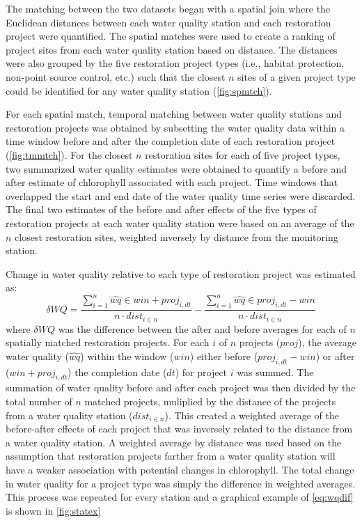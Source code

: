 \documentclass[]{article}
\begin{document}
The matching between the two datasets began with a spatial join where
the Euclidean distances between each water quality station and each
restoration project were quantified. The spatial matches were used to
create a ranking of project sites from each water quality station based
on distance. The distances were also grouped by the five restoration
project types (i.e., habitat protection, non-point source control, etc.)
such that the closest \(n\) sites of a given project type could be
identified for any water quality station (\cref{fig:spmtch}).

For each spatial match, temporal matching between water quality stations
and restoration projects was obtained by subsetting the water quality
data within a time window before and after the completion date of each
restoration project (\cref{fig:tmmtch}). For the closest \(n\)
restoration sites for each of five project types, two summarized water
quality estimates were obtained to quantify a before and after estimate
of chlorophyll associated with each project. Time windows that
overlapped the start and end date of the water quality time series were
discarded. The final two estimates of the before and after effects of
the five types of restoration projects at each water quality station
were based on an average of the \(n\) closest restoration sites,
weighted inversely by distance from the monitoring station.

Change in water quality relative to each type of restoration project was
estimated as: \begin{equation}
\delta WQ = \frac{\sum_{i = 1}^{n} \hat{wq} \in win + proj_{i, dt}}{n \cdot dist_{i \in n}} - \frac{\sum_{i = 1}^{n} \hat{wq} \in proj_{i, dt} - win}{n \cdot dist_{i \in n}}
\label{eq:wqdif}
\end{equation} where \(\delta WQ\) was the difference between the after
and before averages for each of \(n\) spatially matched restoration
projects. For each \(i\) of \(n\) projects (\(proj\)), the average water
quality (\(\hat{wq}\)) within the window (\(win\)) either before
(\(proj_{i, dt} - win\)) or after (\(win + proj_{i, dt}\)) the
completion date (\(dt\)) for project \(i\) was summed. The summation of
water quality before and after each project was then divided by the
total number of \(n\) matched projects, muliplied by the distance of the
projects from a water quality station (\(dist_{i \in n}\)). This created
a weighted average of the before-after effects of each project that was
inversely related to the distance from a water quality station. A
weighted average by distance was used based on the assumption that
restoration projects farther from a water quality station will have a
weaker association with potential changes in chlorophyll. The total
change in water quality for a project type was simply the difference in
weighted averages. This process was repeated for every station and a
graphical example of \cref{eq:wqdif} is shown in \cref{fig:statex}
\end{document}
